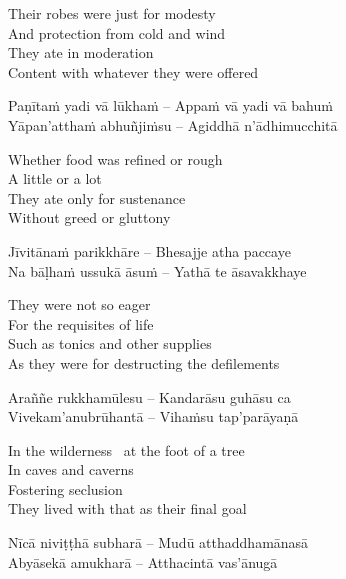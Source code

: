 \begin{english-verses}
  Their robes were just for modesty\\
  And protection from cold and wind\\
  They ate in moderation\\
  Content with whatever they were offered
\end{english-verses}

\begin{verses}
  Paṇītaṁ yadi vā lūkhaṁ – Appaṁ vā yadi vā bahuṁ\\
  Yāpan'atthaṁ abhuñjiṁsu – Agiddhā n'ādhimucchitā
\end{verses}

\begin{english-verses}
  Whether food was refined or rough\\
  A little or a lot\\
  They ate only for sustenance\\
  Without greed or gluttony
\end{english-verses}

\begin{verses}
  Jīvitānaṁ parikkhāre – Bhesajje atha paccaye\\
  Na bāḷhaṁ ussukā āsuṁ – Yathā te āsavakkhaye
\end{verses}

\begin{english-verses}
  They were not so eager\\
  For the requisites of life\\
  Such as tonics and other supplies\\
  As they were for destructing the defilements
\end{english-verses}

\begin{verses}
  Araññe rukkhamūlesu – Kandarāsu guhāsu ca\\
  Vivekam'anubrūhantā – Vihaṁsu tap'parāyaṇā
\end{verses}

\begin{english-verses}
  In the wilderness \breathmark\ at the foot of a tree\\
  In caves and caverns\\
  Fostering seclusion\\
  They lived with that as their final goal
\end{english-verses}

\begin{verses}
  Nīcā niviṭṭhā subharā – Mudū atthaddhamānasā\\
  Abyāsekā amukharā – Atthacintā vas'ānugā
\end{verses}


